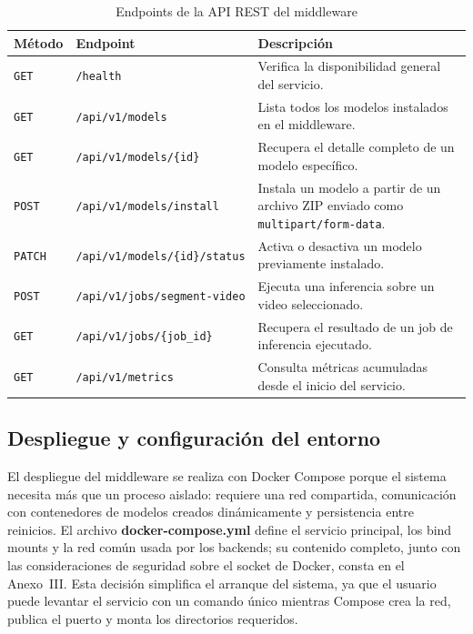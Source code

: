 \documentclass[11pt,a4paper]{article}
\begin{document}
\begin{table}[H]
\centering
\caption{Endpoints de la API REST del middleware}
\label{tab:endpoints_api}
\small
\renewcommand{\arraystretch}{1.18}
\setlength{\tabcolsep}{5pt}

\begin{tabular}{
    >{\centering\arraybackslash}p{1.6cm}
    >{\raggedright\arraybackslash}p{5.0cm}
    >{\raggedright\arraybackslash}p{6.7cm}
}
\toprule
\textbf{Método} & \textbf{Endpoint} & \textbf{Descripción} \\
\midrule

\texttt{GET} &
\texttt{/health} &
Verifica la disponibilidad general del servicio. \\

\texttt{GET} &
\texttt{/api/v1/models} &
Lista todos los modelos instalados en el middleware. \\

\texttt{GET} &
\texttt{/api/v1/models/\{id\}} &
Recupera el detalle completo de un modelo específico. \\

\texttt{POST} &
\texttt{/api/v1/models/install} &
Instala un modelo a partir de un archivo ZIP enviado como \texttt{multipart/form-data}. \\

\texttt{PATCH} &
\texttt{/api/v1/models/\{id\}/status} &
Activa o desactiva un modelo previamente instalado. \\

\texttt{POST} &
\texttt{/api/v1/jobs/segment-video} &
Ejecuta una inferencia sobre un video seleccionado. \\

\texttt{GET} &
\texttt{/api/v1/jobs/\{job\_id\}} &
Recupera el resultado de un job de inferencia ejecutado. \\

\texttt{GET} &
\texttt{/api/v1/metrics} &
Consulta métricas acumuladas desde el inicio del servicio. \\

\bottomrule
\end{tabular}
\end{table}

\subsection{Despliegue y configuración del entorno}

El despliegue del middleware se realiza con Docker Compose porque el sistema necesita más que un proceso aislado: requiere una red compartida, comunicación con contenedores de modelos creados dinámicamente y persistencia entre reinicios. El archivo \textbf{docker-compose.yml} define el servicio principal, los bind mounts y la red común usada por los backends; su contenido completo, junto con las consideraciones de seguridad sobre el socket de Docker, consta en el Anexo~III. Esta decisión simplifica el arranque del sistema, ya que el usuario puede levantar el servicio con un comando único mientras Compose crea la red, publica el puerto y monta los directorios requeridos.
\end{document}
